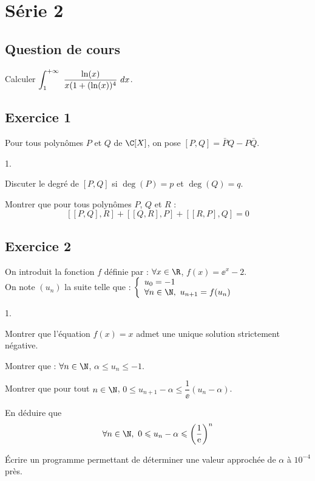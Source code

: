 \documentclass[11pt]{article}%
\begin{document}
\newpage

\section*{Série 2}
\subsection*{Question de cours}
Calculer $\displaystyle \int_{1}^{+\infty}\  \dfrac{\ln(x)}{x(1+(\ln(x))^4} \ dx$.

\subsection*{Exercice 1}
\noindent
Pour tous polynômes $P$ et $Q$ de $\C[X]$, on pose 
$[P,Q]=\bar{P}Q-P\bar{Q}$.
\begin{noliste}{1.}
 \item Discuter le degré de $[P,Q]$ si $\deg(P)=p$ et $\deg(Q)=q$.
 \item Montrer que pour tous polynômes $P$, $Q$ et $R$ :
 \[
  [[P,Q],R]+[[Q,R],P]+[[R,P],Q]=0
 \]
\end{noliste}


\subsection*{Exercice 2}
\noindent
On introduit la fonction $f$ définie par : $\forall x \in\R$, 
$f(x)=\ee^x -2$.\\
On note $(u_n)$ la suite telle que : $\left\{
\begin{array}{ll}
 u_0=-1\\
 \forall n\in\N, \ u_{n+1}=f(u_n)
\end{array}
\right.$
\begin{noliste}{1.}
 \item Montrer que l'équation $f(x)=x$ admet une unique solution 
 strictement négative.
 \item Montrer que : $\forall n \in\N$, $\alpha \leq u_n \leq -1$.
 \item Montrer que pour tout $n\in\N$, $0\leq u_{n+1} -\alpha \leq 
 \dfrac{1}{\ee}(u_n-\alpha)$.
 \item En déduire que 
 \[
  \forall n\in\N, \ 0\leq u_n - \alpha \leq 
  \left(\dfrac{1}{\ee}\right)^n
 \]
 \item Écrire un programme \Scilab{} permettant de déterminer une 
 valeur approchée de $\alpha$ à $10^{-4}$ près.
\end{noliste}
\end{document}
